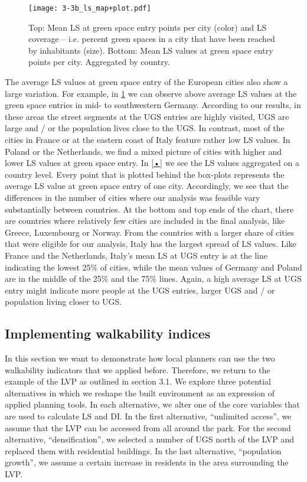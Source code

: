 \documentclass[10pt]{article}
\begin{document}
\begin{figure}
\centering
\texttt{[image: 3-3b\_ls\_map+plot.pdf]}
\caption{Top: Mean LS at green space entry points per city (color) and LS coverage – i.e. percent green spaces in a city that have been reached by inhabitants (size). Bottom: Mean LS values at green space entry points per city. Aggregated by country.}
\label{fig:lsmap}
\end{figure}

The average LS values at green space entry of the European cities also show a large variation.
For example, in \ref{fig:lsmap} we can observe above average LS values at the green space entries in mid- to southwestern Germany.
According to our results, in these areas the street segments at the UGS entries are highly visited, UGS are large and / or the population lives close to the UGS. 
In contrast, most of the cities in France or at the eastern coast of Italy feature rather low LS values.  
In Poland or the Netherlands, we find a mixed picture of cities with higher and lower LS values at green space entry.
In \ref{•} we see the LS values aggregated on a country level. 
Every point that is plotted behind the box-plots represents the average LS value at green space entry of one city.
Accordingly, we see that the differences in the number of cities where our analysis was feasible vary substantially between countries.
At the bottom and top ends of the chart, there are countries where relatively few cities are included in the final analysis, like Greece, Luxembourg or Norway.
From the countries with a larger share of cities that were eligible for our analysis, Italy has the largest spread of LS values.
Like France and the Netherlands, Italy’s mean LS at UGS entry is at the line indicating the lowest 25\% of cities, while the mean values of Germany and Poland are in the middle of the 25\% and the 75\% lines.
Again, a high average LS at UGS entry might indicate more people at the UGS entries, larger UGS and / or population living closer to UGS.


\subsection{Implementing walkability indices}
In this section we want to demonstrate how local planners can use the two walkability indicators that we applied before.
Therefore, we return to the example of the LVP as outlined in section 3.1.
We explore three potential alternatives in which we reshape the built environment as an expression of applied planning tools.
In each alternative, we alter one of the core variables that are used to calculate LS and DI.
In the first alternative, “unlimited access”, we assume that the LVP can be accessed from all around the park.
For the second alternative, “densification”, we selected a number of UGS north of the LVP and replaced them with residential buildings.
In the last alternative, “population growth”, we assume a certain increase in residents in the area surrounding the LVP.
\end{document}
